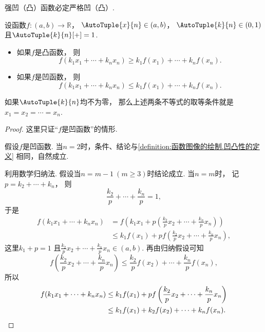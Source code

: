 \begin{proposition}
强凹（凸）函数必定严格凹（凸）.
\end{proposition}

\begin{proposition}[延森不等式]
设函数\(f\colon(a,b)\to\mathbb{R}\)，
\(\AutoTuple{x}{n}\in(a,b)\)，
\(\AutoTuple{k}{n}\in(0,1)\)
且\(\AutoTuple{k}{n}[+]=1\).
\begin{itemize}
	\item 如果\(f\)是凸函数，
	则\[
		f(k_1 x_1 + \dotsb + k_n x_n)
		\geq
		k_1 f(x_1) + \dotsb + k_n f(x_n).
	\]
	\item 如果\(f\)是凹函数，
	则\[
		f(k_1 x_1 + \dotsb + k_n x_n)
		\leq
		k_1 f(x_1) + \dotsb + k_n f(x_n).
	\]
\end{itemize}
如果\(\AutoTuple{k}{n}\)均不为零，
那么上述两条不等式的取等条件就是\(x_1=x_2=\dotsb=x_n\).
\begin{proof}
这里只证“\(f\)是凹函数”的情形.

假设\(f\)是凹函数.
当\(n=2\)时，条件、结论与\cref{definition:函数图像的绘制.凹凸性的定义} 相同，自然成立.

利用数学归纳法.
假设当\(n=m-1\ (m\geq3)\)时结论成立.
当\(n=m\)时，
记\(p = k_2 + \dotsb + k_n\)，
则\[
	\frac{k_2}{p} + \dotsb + \frac{k_n}{p} = 1,
\]
于是\begin{align*}
	f(k_1 x_1 + \dotsb + k_n x_n)
	&= f\left( k_1 x_1 + p \left( \frac{k_2}{p} x_2 + \dotsb + \frac{k_n}{p} x_n \right) \right) \\
	&\leq k_1 f(x_1) + p f\left( \frac{k_2}{p} x_2 + \dotsb + \frac{k_n}{p} x_n \right),
\end{align*}
这里\(k_1 + p = 1\)
且\(\frac{k_2}{p} x_2 + \dotsb + \frac{k_n}{p} x_n \in (a,b)\).
再由归纳假设可知\[
	f\left( \frac{k_2}{p} x_2 + \dotsb + \frac{k_n}{p} x_n \right)
	\leq \frac{k_2}{p} f(x_2) + \dotsb + \frac{k_n}{p} f(x_n),
\]
所以\begin{align*}
	f(k_1 x_1 + \dotsb + k_n x_n)
	&\leq k_1 f(x_1) + p f\left( \frac{k_2}{p} x_2 + \dotsb + \frac{k_n}{p} x_n \right) \\
	&\leq k_1 f(x_1) + k_2 f(x_2) + \dotsb + k_n f(x_n).
	\qedhere
\end{align*}
\end{proof}
\end{proposition}

